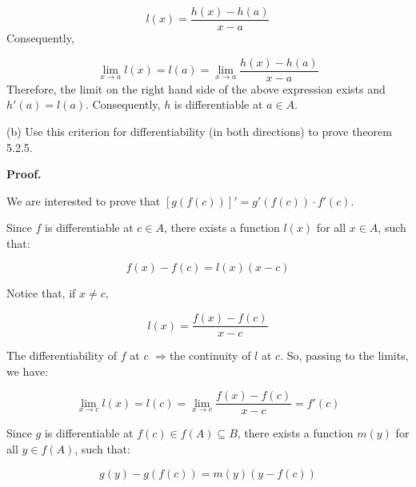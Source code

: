 \documentclass[10pt]{article}
\begin{document}
\begin{equation*}
l( x) =\frac{h( x) -h( a)}{x-a}
\end{equation*}
Consequently,


\begin{equation*}
\lim _{x\rightarrow a} l( x) =l( a) =\lim _{x\rightarrow a}\frac{h( x) -h( a)}{x-a}
\end{equation*}
Therefore, the limit on the right hand side of the above expression exists and $\displaystyle h'( a) =l( a)$. Consequently, $\displaystyle h$ is differentiable at $\displaystyle a\in A$.



(b) Use this criterion for differentiability (in both directions) to prove theorem 5.2.5. 



\textbf{Proof.}



We are interested to prove that $\displaystyle [ g( f( c))] '=g'( f( c)) \cdot f'( c)$. 



Since $\displaystyle f$ is differentiable at $\displaystyle c\in A$, there exists a function $\displaystyle l( x)$ for all $\displaystyle x\in A$, such that:


\begin{equation*}
f( x) -f( c) =l( x)( x-c)
\end{equation*}


Notice that, if $\displaystyle x\neq c$, 


\begin{equation*}
l( x) =\frac{f( x) -f( c)}{x-c}
\end{equation*}


The differentiability of $\displaystyle f$ at $\displaystyle c$ $\displaystyle \Longrightarrow $the continuity of $\displaystyle l$ at $\displaystyle c$. So, passing to the limits, we have:


\begin{equation*}
\lim _{x\rightarrow c} l( x) =l( c) =\lim _{x\rightarrow c}\frac{f( x) -f( c)}{x-c} =f'( c)
\end{equation*}


Since $\displaystyle g$ is differentiable at $\displaystyle f( c) \in f( A) \subseteq B$, there exists a function $\displaystyle m( y)$ for all $\displaystyle y\in f( A)$, such that:


\begin{equation*}
g( y) -g( f( c)) =m( y)( y-f( c))
\end{equation*}
 $ $
\end{document}
